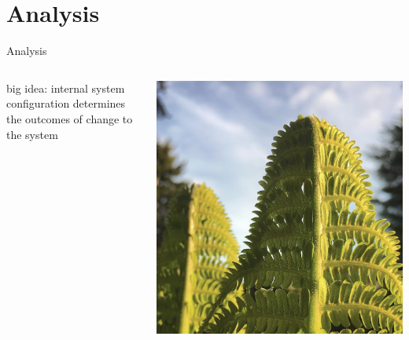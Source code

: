 \section{Analysis}

\begin{frame}{Analysis}
\begin{columns}
\begin{column}{0.6\textwidth}
  \alert{big idea}: internal system configuration determines the outcomes of change to the system
\end{column}
\begin{column}{0.4\textwidth}
\begin{center}
\includegraphics[width=\textwidth,trim={8cm 0 5cm 0},clip]{img/curled_fern}
\end{center}
\end{column}
\end{columns}
\end{frame}


